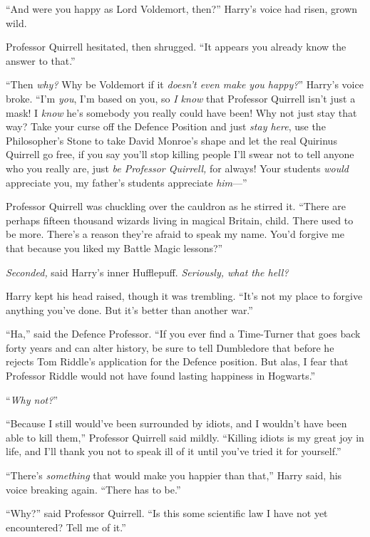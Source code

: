 “And were you happy as Lord Voldemort, then?” Harry’s voice had risen, grown
wild.

Professor Quirrell hesitated, then shrugged. “It appears you already know the
answer to that.”

“Then \emph{why?} Why be Voldemort if it \emph{doesn’t even make you happy?}”
Harry’s voice broke. “I’m \emph{you}, I’m based on you, so \emph{I know} that
Professor Quirrell isn’t just a mask! I \emph{know} he’s somebody you really
could have been! Why not just stay that way? Take your curse off the Defence
Position and just \emph{stay here}, use the Philosopher’s Stone to take David
Monroe’s shape and let the real Quirinus Quirrell go free, if you say you’ll
stop killing people I’ll swear not to tell anyone who you really are,
just \emph{be Professor Quirrell,} for always! Your students \emph{would}
appreciate you, my father’s students appreciate \emph{him}—”

Professor Quirrell was chuckling over the cauldron as he stirred it. “There are
perhaps fifteen thousand wizards living in magical Britain, child. There used
to be more. There’s a reason they’re afraid to speak my name. You’d forgive me
that because you liked my Battle Magic lessons?”

\emph{Seconded,} said Harry’s inner Hufflepuff. \emph{Seriously, what the hell?}

Harry kept his head raised, though it was trembling. “It’s not my place to
forgive anything you’ve done. But it’s better than another war.”

“Ha,” said the Defence Professor. “If you ever find a Time-Turner that goes
back forty years and can alter history, be sure to tell Dumbledore that before
he rejects Tom Riddle’s application for the Defence position. But alas, I fear
that Professor Riddle would not have found lasting happiness in Hogwarts.”

“\emph{Why not?}”

“Because I still would’ve been surrounded by idiots, and I wouldn’t have been
able to kill them,” Professor Quirrell said mildly. “Killing idiots is my great
joy in life, and I’ll thank you not to speak ill of it until you’ve tried it
for yourself.”

“There’s \emph{something} that would make you happier than that,” Harry said,
his voice breaking again. “There has to be.”

“Why?” said Professor Quirrell. “Is this some scientific law I have not yet
encountered? Tell me of it.”

